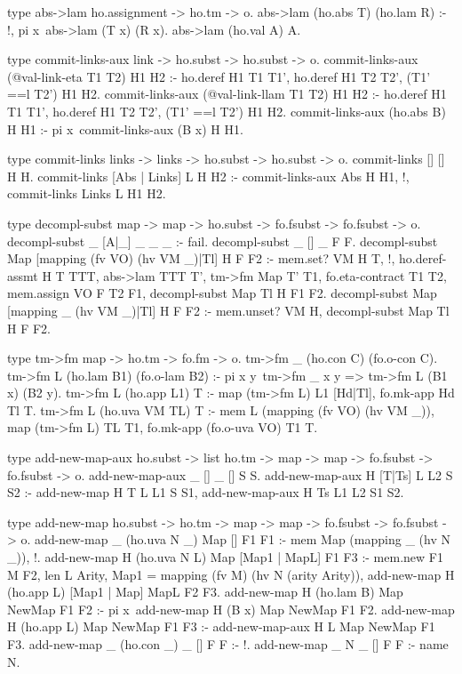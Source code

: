 \begin{elpicode}
  
  type abs->lam ho.assignment -> ho.tm -> o.
  abs->lam (ho.abs T) (ho.lam R)  :- !, pi x\ abs->lam (T x) (R x).
  abs->lam (ho.val A) A.

  type commit-links-aux link -> ho.subst -> ho.subst -> o.
  commit-links-aux (@val-link-eta T1 T2) H1 H2 :- 
    ho.deref H1 T1 T1', ho.deref H1 T2 T2',
    (T1' ==l T2') H1 H2.
  commit-links-aux (@val-link-llam T1 T2) H1 H2 :- 
    ho.deref H1 T1 T1', ho.deref H1 T2 T2',
    (T1' ==l T2') H1 H2.
  commit-links-aux (ho.abs B) H H1 :- 
    pi x\ commit-links-aux (B x) H H1.

  type commit-links links -> links -> ho.subst -> ho.subst -> o.
  commit-links [] [] H H.
  commit-links [Abs | Links] L H H2 :- 
    commit-links-aux Abs H H1, !, commit-links Links L H1 H2.

  type decompl-subst map -> map -> ho.subst -> 
    fo.fsubst -> fo.fsubst -> o.
  decompl-subst _ [A|_] _ _ _ :- fail.
  decompl-subst _ [] _ F F.
  decompl-subst Map [mapping (fv VO) (hv VM _)|Tl] H F F2 :- 
    mem.set? VM H T, !, 
    ho.deref-assmt H T TTT,
    abs->lam TTT T', tm->fm Map T' T1, 
    fo.eta-contract T1 T2, mem.assign VO F T2 F1,
    decompl-subst Map Tl H F1 F2. 
  decompl-subst Map [mapping _ (hv VM _)|Tl] H F F2 :- 
    mem.unset? VM H, decompl-subst Map Tl H F F2.

  type tm->fm map -> ho.tm -> fo.fm -> o.
  tm->fm _ (ho.con C)  (fo.o-con C).
  tm->fm L (ho.lam B1) (fo.o-lam B2) :- 
    pi x y\ tm->fm _ x y => tm->fm L (B1 x) (B2 y).
  tm->fm L (ho.app L1) T :- map (tm->fm L) L1 [Hd|Tl], 
    fo.mk-app Hd Tl T.
  tm->fm L (ho.uva VM TL) T :- mem L (mapping (fv VO) (hv VM _)), 
    map (tm->fm L) TL T1, fo.mk-app (fo.o-uva VO) T1 T.

  type add-new-map-aux ho.subst -> list ho.tm -> map -> 
        map ->  fo.fsubst -> fo.fsubst -> o.
  add-new-map-aux _ [] _ [] S S.
  add-new-map-aux H [T|Ts] L L2 S S2 :- 
    add-new-map H T L L1 S S1, 
    add-new-map-aux H Ts L1 L2 S1 S2.

  type add-new-map ho.subst -> ho.tm -> map -> 
      map ->  fo.fsubst -> fo.fsubst -> o.
  add-new-map _ (ho.uva N _) Map [] F1 F1 :- 
    mem Map (mapping _ (hv N _)), !.
  add-new-map H (ho.uva N L) Map [Map1 | MapL] F1 F3 :-
    mem.new F1 M F2,
    len L Arity, Map1 = mapping (fv M) (hv N (arity Arity)),
    add-new-map H (ho.app L) [Map1 | Map] MapL F2 F3.
  add-new-map H (ho.lam B) Map NewMap F1 F2 :- 
    pi x\ add-new-map H (B x) Map NewMap F1 F2.
  add-new-map H (ho.app L) Map NewMap F1 F3 :- 
    add-new-map-aux H L Map NewMap F1 F3.
  add-new-map _ (ho.con _) _ [] F F :- !.
  add-new-map _ N _ [] F F :- name N.


\end{elpicode}
